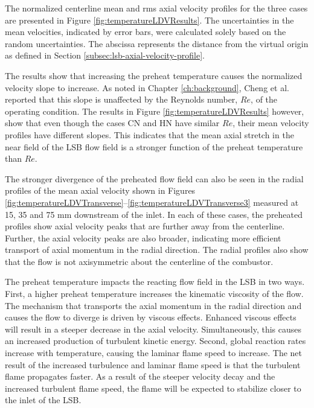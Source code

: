 

The normalized centerline mean and rms axial velocity profiles for the three cases are presented in Figure \ref{fig:temperatureLDVResults}.
The uncertainties in the mean velocities, indicated by error bars, were calculated solely based on the random uncertainties.
The abscissa represents the distance from the virtual origin as defined in Section \ref{subsec:lsb-axial-velocity-profile}.



The results show that increasing the preheat temperature causes the normalized velocity slope to increase.
As noted in Chapter \ref{ch:background}, Cheng et al.\cite{2008-cheng-a} reported that this slope is unaffected by the Reynolds number, \(Re\), of the operating condition.
The results in Figure \ref{fig:temperatureLDVResults} however, show that even though the cases CN and HN have similar \(Re\), their mean velocity profiles have different slopes.
This indicates that the mean axial stretch in the near field of the LSB flow field is a stronger function of the preheat temperature than \(Re\).


The stronger divergence of the preheated flow field can also be seen in the radial profiles of the mean axial velocity shown in Figures \ref{fig:temperatureLDVTransverse}--\ref{fig:temperatureLDVTransverse3} measured at 15, 35 and 75 mm downstream of the inlet.
In each of these cases, the preheated profiles show axial velocity peaks that are further away from the centerline.
Further, the axial velocity peaks are also broader, indicating more efficient transport of axial momentum in the radial direction.
The radial profiles also show that the flow is not axisymmetric about the centerline of the combustor.





The preheat temperature impacts the reacting flow field in the LSB in two ways.
First, a higher preheat temperature increases the kinematic viscosity of the flow.
The mechanism that transports the axial momentum in the radial direction and causes the flow to diverge is driven by viscous effects.
Enhanced viscous effects will result in a steeper decrease in the axial velocity.
Simultaneously, this causes an increased production of turbulent kinetic energy.
Second, global reaction rates increase with temperature, causing the laminar flame speed to increase.
The net result of the increased turbulence and laminar flame speed is that the turbulent flame propagates faster.
As a result of the steeper velocity decay and the increased turbulent flame speed, the flame will be expected to stabilize closer to the inlet of the LSB.

